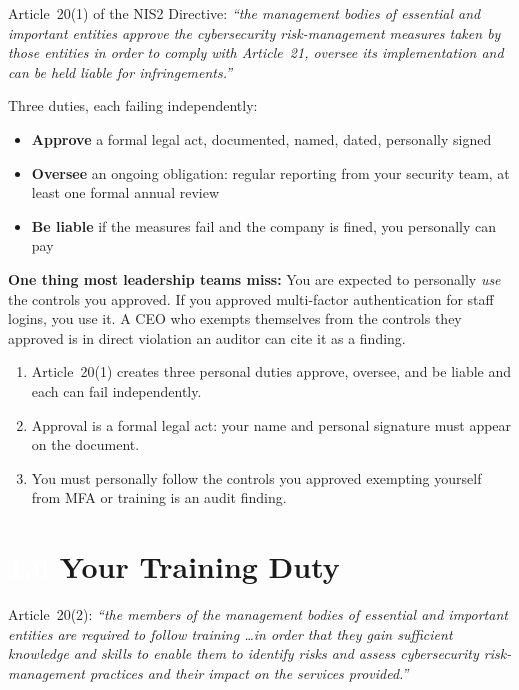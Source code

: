 \documentclass[11pt,a4paper,twoside]{book}
\newcommand{\lessontag}[1]{%
  \texorpdfstring{%
    \setlength{\fboxsep}{3pt}\colorbox{nisd2blue}{\textcolor{white}{\footnotesize\bfseries #1}}\quad%
  }{Lesson #1\ }%
}
\begin{document}
Article~20(1) of the NIS2 Directive: \textit{``the management bodies of essential and important entities approve the cybersecurity risk-management measures taken by those entities in order to comply with Article~21, oversee its implementation and can be held liable for infringements.''}

Three duties, each failing independently:

\begin{itemize}
  \item \textbf{Approve} a formal legal act, documented, named, dated, personally signed
  \item \textbf{Oversee} an ongoing obligation: regular reporting from your security team, at least one formal annual review
  \item \textbf{Be liable} if the measures fail and the company is fined, you personally can pay
\end{itemize}

\textbf{One thing most leadership teams miss:} You are expected to personally \emph{use} the controls you approved. If you approved multi-factor authentication for staff logins, you use it. A CEO who exempts themselves from the controls they approved is in direct violation  an auditor can cite it as a finding.

\begin{keytakeaways}
\begin{enumerate}
  \item Article~20(1) creates three personal duties approve, oversee, and be liable and each can fail independently.
  \item Approval is a formal legal act: your name and personal signature must appear on the document.
  \item You must personally follow the controls you approved exempting yourself from MFA or training is an audit finding.
\end{enumerate}
\end{keytakeaways}

\section{\lessontag{1.6}Your Training Duty}

Article~20(2): \textit{``the members of the management bodies of essential and important entities are required to follow training \ldots in order that they gain sufficient knowledge and skills to enable them to identify risks and assess cybersecurity risk-management practices and their impact on the services provided.''}
\end{document}

